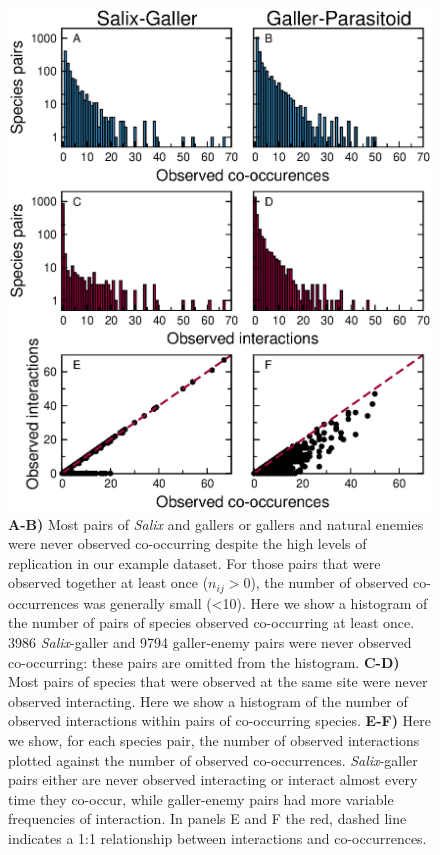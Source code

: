 \documentclass[12pt]{article}
\begin{document}
    \begin{figure}
      \caption{\textbf{A-B)} Most pairs of \emph{Salix} and gallers or gallers and natural enemies were never observed co-occurring despite the high levels of replication in our example dataset. For those pairs that were observed together at least once ($n_{ij}>0$), the number of observed co-occurrences was generally small (\textless10). Here we show a histogram of the number of pairs of species observed co-occurring at least once. 3986 \emph{Salix}-galler and 9794 galler-enemy pairs were never observed co-occurring: these pairs are omitted from the histogram. \textbf{C-D)} Most pairs of species that were observed at the same site were never observed interacting. Here we show a histogram of the number of observed interactions within pairs of co-occurring species. \textbf{E-F)} Here we show, for each species pair, the number of observed interactions plotted against the number of observed co-occurrences. \emph{Salix}-galler pairs either are never observed interacting or interact almost every time they co-occur, while galler-enemy pairs had more variable frequencies of interaction. In panels E and F the red, dashed line indicates a 1:1 relationship between interactions and co-occurrences.}
      \label{histograms}
      \includegraphics*[width=.8\textwidth]{figures/Salix_Galler_histogram.eps}
      \end{figure}
\end{document}
